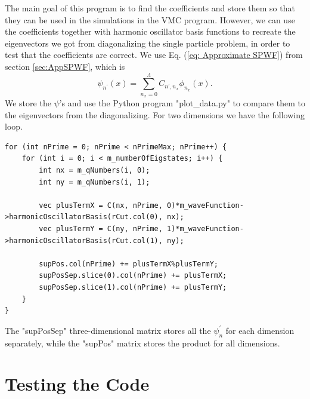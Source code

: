 \documentclass[../main.tex]{subfiles}
\begin{document}
The main goal of this program is to find the coefficients and store them so that they can be used in the simulations in the VMC program. However, we can use the coefficients together with harmonic oscillator basis functions to recreate the eigenvectors we got from diagonalizing the single particle problem, in order to test that the coefficients are correct. We use Eq. (\ref{eq: Approximate SPWF}) from section \ref{sec:AppSPWF}, which is
\begin{equation}\label{eq: Approximate SPWF2}
    \psi_{n^\prime}(x) = \sum_{n_x=0}^{\Lambda} C_{n^\prime,n_x} \phi_{n_x}(x).
\end{equation}
We store the $\psi$'s and use the Python program "plot\_data.py" to compare them to the eigenvectors from the diagonalizing. For two dimensions we have the following loop.
\lstset{language=c++}
\begin{lstlisting}[caption={}]
for (int nPrime = 0; nPrime < nPrimeMax; nPrime++) {
    for (int i = 0; i < m_numberOfEigstates; i++) {
        int nx = m_qNumbers(i, 0);
        int ny = m_qNumbers(i, 1);

        vec plusTermX = C(nx, nPrime, 0)*m_waveFunction->harmonicOscillatorBasis(rCut.col(0), nx);
        vec plusTermY = C(ny, nPrime, 1)*m_waveFunction->harmonicOscillatorBasis(rCut.col(1), ny);

        supPos.col(nPrime) += plusTermX%plusTermY;
        supPosSep.slice(0).col(nPrime) += plusTermX;
        supPosSep.slice(1).col(nPrime) += plusTermY;
    }
}
\end{lstlisting}
The "supPosSep" three-dimensional matrix stores all the $\psi_n^\prime$ for each dimension separately, while the "supPos" matrix stores the product for all dimensions.









\chapter{Testing the Code}\label{sec: Testing}
\end{document}
